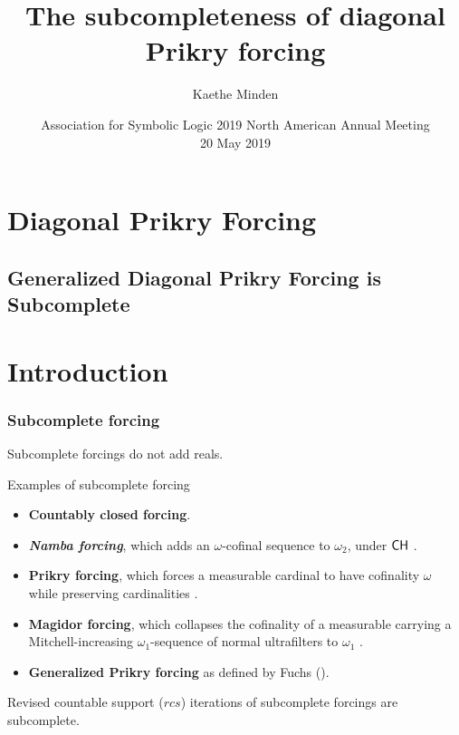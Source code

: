 \documentclass[utf8x,xcolor=svgnames,8pt]{beamer}
\title{The subcompleteness of diagonal Prikry forcing}
\author{Kaethe Minden}
\institute[Marlboro]{\texttt{[image: mc-logo.png]} \\ Vermont, USA}
\date[ASL 2019]{Association for Symbolic Logic 2019 North American Annual Meeting \\ 20 May 2019}
\renewcommand{\P}{\mathbb{P}}
\newcommand{\Q}{\mathbb{Q}}
\newcommand{\CH}{\textup{\textsf{CH}}}
\newcommand{\To}{\longrightarrow}
\begin{document}
\begin{frame}[plain]
\titlepage
\end{frame}

\section{Diagonal Prikry Forcing}
\subsection{Generalized Diagonal Prikry Forcing is Subcomplete}

\section{Introduction}
\begin{frame}
\frametitle{Subcomplete forcing} 
Subcomplete forcings do not add reals.
\begin{block}{Examples of subcomplete forcing}
\begin{itemize}
	\item \textbf{Countably closed forcing}.
	\item \textit{\textbf{Namba forcing}}, which adds an $\omega$-cofinal sequence to $\omega_2$, under $\CH$ \cite{Jensen:2014}.
	\item \textbf{Prikry forcing}, which forces a measurable cardinal to have cofinality $\omega$ while preserving cardinalities \cite{Jensen:2014}.
	\item \textbf{Magidor forcing}, which collapses the cofinality of a measurable carrying a Mitchell-increasing $\omega_1$-sequence of normal ultrafilters to $\omega_1$ \cite{Fuchs:2017Magidor}.
	\item \color{Green} \textbf{Generalized Prikry forcing} as defined by Fuchs (\cite{Fuchs:2005kx}).
\end{itemize}
\end{block}
	Revised countable support ($rcs$) iterations of subcomplete forcings are subcomplete.
\end{frame}
\end{document}
